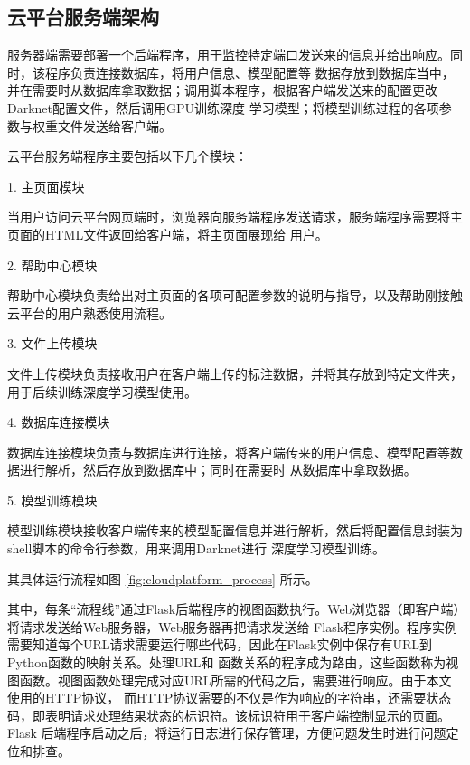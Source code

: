 \subsection{云平台服务端架构}

服务器端需要部署一个后端程序，用于监控特定端口发送来的信息并给出响应。同时，该程序负责连接数据库，将用户信息、模型配置等
数据存放到数据库当中，并在需要时从数据库拿取数据；调用脚本程序，根据客户端发送来的配置更改Darknet配置文件，然后调用GPU训练深度
学习模型；将模型训练过程的各项参数与权重文件发送给客户端。

云平台服务端程序主要包括以下几个模块：

1. 主页面模块

当用户访问云平台网页端时，浏览器向服务端程序发送请求，服务端程序需要将主页面的HTML文件返回给客户端，将主页面展现给
用户。

2. 帮助中心模块

帮助中心模块负责给出对主页面的各项可配置参数的说明与指导，以及帮助刚接触云平台的用户熟悉使用流程。

3. 文件上传模块

文件上传模块负责接收用户在客户端上传的标注数据，并将其存放到特定文件夹，用于后续训练深度学习模型使用。

4. 数据库连接模块

数据库连接模块负责与数据库进行连接，将客户端传来的用户信息、模型配置等数据进行解析，然后存放到数据库中；同时在需要时
从数据库中拿取数据。

5. 模型训练模块

模型训练模块接收客户端传来的模型配置信息并进行解析，然后将配置信息封装为shell脚本的命令行参数，用来调用Darknet进行
深度学习模型训练。

其具体运行流程如图 \ref{fig:cloudplatform_process} 所示。

其中，每条“流程线”通过Flask后端程序的视图函数执行。Web浏览器（即客户端）将请求发送给Web服务器，Web服务器再把请求发送给
Flask程序实例。程序实例需要知道每个URL请求需要运行哪些代码，因此在Flask实例中保存有URL到Python函数的映射关系。处理URL和
函数关系的程序成为路由，这些函数称为视图函数。视图函数处理完成对应URL所需的代码之后，需要进行响应。由于本文使用的HTTP协议，
而HTTP协议需要的不仅是作为响应的字符串，还需要状态码，即表明请求处理结果状态的标识符。该标识符用于客户端控制显示的页面。Flask
后端程序启动之后，将运行日志进行保存管理，方便问题发生时进行问题定位和排查。


